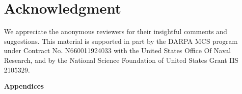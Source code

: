 \documentclass[11pt]{article}
\begin{document}
\section*{Acknowledgment}

We appreciate the anonymous reviewers for their insightful comments and suggestions. 
This material is supported in part by the DARPA MCS program under Contract No. N660011924033 with the United States Office Of Naval Research, and by the National Science Foundation of United States Grant IIS 2105329.





\appendix



\vspace{2em}
\begin{center}
    {
    \Large\textbf{Appendices}
    }
\end{center}
\end{document}
